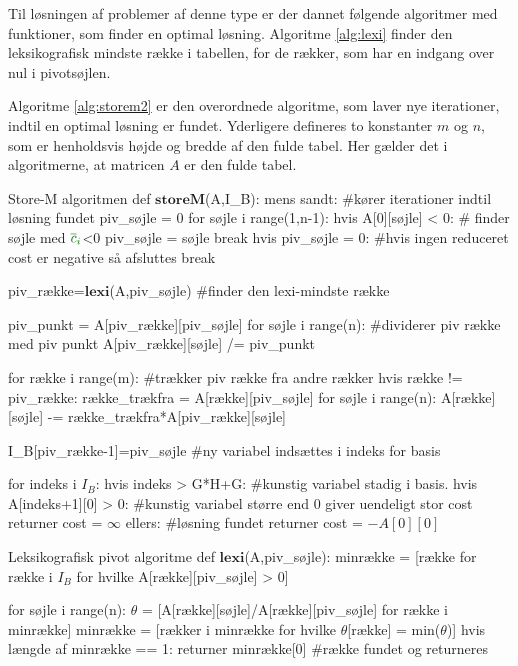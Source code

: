 Til løsningen af problemer af denne type er der dannet følgende algoritmer med funktioner, som finder en optimal løsning. Algoritme \ref{alg:lexi} finder den leksikografisk mindste række i tabellen, for de rækker, som har en indgang over nul i pivotsøjlen. 

Algoritme \ref{alg:storem2} er den overordnede algoritme, som laver nye iterationer, indtil en optimal løsning er fundet. Yderligere defineres to konstanter $m$ og $n$, som er henholdsvis højde og bredde af den fulde tabel. Her gælder det i algoritmerne, at matricen $A$ er den fulde tabel.

\newpage

\begin{alg}[label={alg:storem2}]{Store-M algoritmen}
def $\textbf{storeM}$(A,I_B):
    mens sandt: #kører iterationer indtil løsning fundet
    	piv_søjle = 0
    	for søjle i range(1,n-1): 
        	hvis A[0][søjle] < 0: # finder søjle med ${\color{commentgreen} \overline{c}_i}$<0
            	piv_søjle = søjle
            	break
		hvis piv_søjle = 0: #hvis ingen reduceret cost er negative så afsluttes
			break
            
    	piv_række=$\textbf{lexi}$(A,piv_søjle) #finder den lexi-mindste række
            
    	piv_punkt = A[piv_række][piv_søjle] 
    	for søjle i range(n): #dividerer piv række med piv punkt
        	A[piv_række][søjle] /= piv_punkt
            
    	for række i range(m): #trækker piv række fra andre rækker
        	hvis række != piv_række:
            	række_trækfra = A[række][piv_søjle]
            	for søjle i range(n):
                	A[række][søjle] -= række_trækfra*A[piv_række][søjle]

    	I_B[piv_række-1]=piv_søjle #ny variabel indsættes i indeks for basis

	for indeks i $I_B$: 
		hvis indeks > G*H+G: #kunstig variabel stadig i basis. 
			hvis A[indeks+1][0] > 0: #kunstig variabel større end 0 giver uendeligt stor cost
				returner cost = $\infty$
	ellers: #løsning fundet
		returner cost = $-A[0][0]$
\end{alg}

\begin{alg}[label={alg:lexi}]{Leksikografisk pivot algoritme}
def $\textbf{lexi}$(A,piv_søjle):
	minrække = [række for række i $I_B$ for hvilke A[række][piv_søjle] > 0]
	
	for søjle i range(n):
		$\theta$ = [A[række][søjle]/A[række][piv_søjle] for række i minrække]
		minrække = [rækker i minrække for hvilke $\theta$[række] = min($\theta$)]
		hvis længde af minrække == 1:
			returner minrække[0] #række fundet og returneres
\end{alg}




